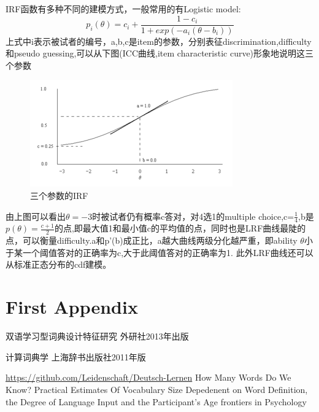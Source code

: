 \documentclass[12pt]{article}
\begin{document}
IRF函数有多种不同的建模方式，一般常用的有Logistic model:
\begin{equation}
p_i(\theta)=c_i+\frac{1-c_i}{1+exp(-a_i(\theta-b_i))}
\end{equation}
上式中i表示被试者的编号，a,b,c是item的参数，分别表征discrimination,difficulty和pseudo guessing,可以从下图(ICC曲线,item characteristic curve)形象地说明这三个参数
\begin{figure}
\caption{三个参数的IRF}
\includegraphics[width=\linewidth]{3PL_IRF.png}
\end{figure}
由上图可以看出$\theta=-3$时被试者仍有概率c答对，对4选1的multiple choice,c=$\frac{1}{4}$,b是$p(\theta)=\frac{c+1}{2}$的点,即最大值1和最小值c的平均值的点，同时也是LRF曲线最陡的点，可以衡量difficulty.a和p'(b)成正比，a越大曲线两级分化越严重，即ability $\theta$小于某一个阈值答对的正确率为c,大于此阈值答对的正确率为1.
此外LRF曲线还可以从标准正态分布的cdf建模。
\appendix
\section{First Appendix}
\begin{thebibliography}{}
双语学习型词典设计特征研究 外研社2013年出版

 计算词典学 上海辞书出版社2011年版

 \url{https://github.com/Leidenschaft/Deutsch-Lernen}
 How Many Words Do We Know? Practical Estimates Of
Vocabulary Size Depedenent on Word Definition, the Degree of Language Input and the Participant's Age		frontiers in Psychology
\end{thebibliography}
\end{document}
